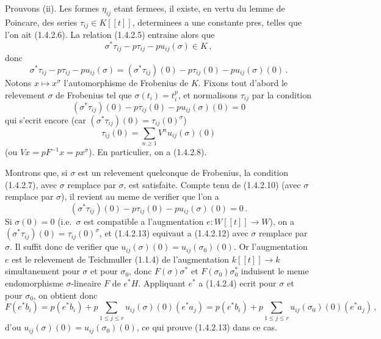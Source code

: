 \documentclass[12pt,a4paper]{article}
\theoremstyle{plain}
\theoremstyle{definition}
\theoremstyle{remark}
\begin{document}
Prouvons (ii). Les formes $\eta_{ij}$ etant fermees, il existe, en vertu du lemme de Poincare, des series $\tau_{ij} \in K[[t]]$, determinees a une constante pres, telles que l'on ait (1.4.2.6). La relation (1.4.2.5) entraine alors que
\[
\sigma^*\tau_{ij} - p\tau_{ij} - pu_{ij}(\sigma) \in K\,,
\]
donc
\begin{equation}\label{eq:1.4.2.10}
\sigma^*\tau_{ij} - p\tau_{ij} - pu_{ij}(\sigma) = (\sigma^*\tau_{ij})(0) - p\tau_{ij}(0) - pu_{ij}(\sigma)(0)\,.\end{equation}
Notons $x \mapsto x^\sigma$ l'automorphisme de Frobenius de $K$. Fixons tout d'abord le relevement $\sigma$ de Frobenius tel que $\sigma(t_i) = t_i^p$, et normalisons $\tau_{ij}$ par la condition
\begin{equation}\label{eq:1.4.2.11}
(\sigma^*\tau_{ij})(0) - p\tau_{ij}(0) - pu_{ij}(\sigma)(0) = 0\end{equation}
qui s'ecrit encore (car $(\sigma^*\tau_{ij})(0) = \tau_{ij}(0)^\sigma$)
\begin{equation}\label{eq:1.4.2.12}
\tau_{ij}(0) = \sum_{n \geq 1} V^nu_{ij}(\sigma)(0)\end{equation}
(ou $Vx = pF^{-1}x = px^\sigma$). En particulier, on a (1.4.2.8).

Montrons que, si $\sigma$ est un relevement quelconque de Frobenius, la condition (1.4.2.7), avec $\sigma$ remplace par $\sigma$, est satisfaite. Compte tenu de (1.4.2.10) (avec $\sigma$ remplace par $\sigma$), il revient au meme de verifier que l'on a
\begin{equation}\label{eq:1.4.2.13}
(\sigma^*\tau_{ij})(0) - p\tau_{ij}(0) - pu_{ij}(\sigma)(0) = 0\,.\end{equation}
Si $\sigma(0) = 0$ (i.e.\ $\sigma$ est compatible a l'augmentation $e : W[[t]] \to W$), on a $(\sigma^*\tau_{ij})(0) = \tau_{ij}(0)^\sigma$, et (1.4.2.13) equivaut a (1.4.2.12) avec $\sigma$ remplace par $\sigma$. Il suffit donc de verifier que $u_{ij}(\sigma)(0) = u_{ij}(\sigma_0)(0)$. Or l'augmentation $e$ est le relevement de Teichmuller (1.1.4) de l'augmentation $k[[t]] \to k$ simultanement pour $\sigma$ et pour $\sigma_0$, donc $F(\sigma)\sigma^*$ et $F(\sigma_0)\sigma_0^*$ induisent le meme endomorphisme $\sigma$-lineaire $F$ de $e^*H$. Appliquant $e^*$ a (1.4.2.4) ecrit pour $\sigma$ et pour $\sigma_0$, on obtient donc
\[
F(e^*b_i) = p(e^*b_i) + p\sum_{1 \leq j \leq r} u_{ij}(\sigma)(0)(e^*a_j) = p(e^*b_i) + p\sum_{1 \leq j \leq r} u_{ij}(\sigma_0)(0)(e^*a_j)\,,
\]
d'ou $u_{ij}(\sigma)(0) = u_{ij}(\sigma_0)(0)$, ce qui prouve (1.4.2.13) dans ce cas.
\end{document}
